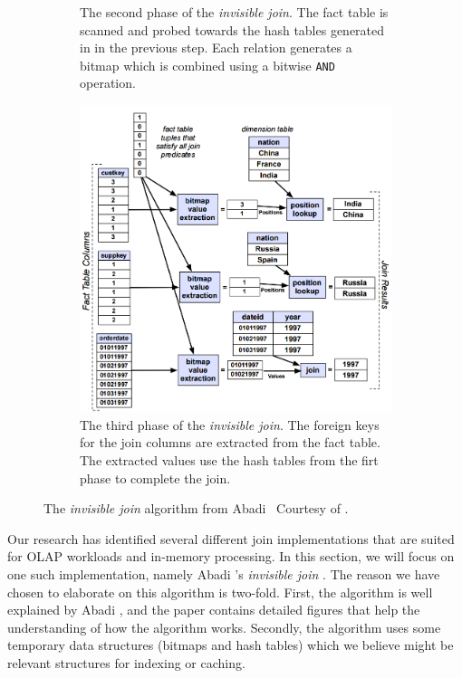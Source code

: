 \begin{figure}
\begin{subfigure}{0.48\textwidth}
    \caption{The second phase of the \textit{invisible join}. The fact table is scanned and probed towards the hash tables generated in in the previous step. Each relation generates a bitmap which is combined using a bitwise \texttt{AND} operation.}
    \label{fig:invisible-join-2} 
  \end{subfigure}
  \begin{subfigure}{0.48\textwidth}
    \includegraphics[width=\textwidth]{img/invisible-join-3.png}
    \caption{The third phase of the \textit{invisible join}. The foreign keys for the join columns are extracted from the fact table. The extracted values use the  hash tables from the firt phase to complete the join.}
    \label{fig:invisible-join-3} 
  \end{subfigure}
  \caption{The \textit{invisible join} algorithm from Abadi \ea~Courtesy of \cite{Abadi2008-dd}.}
  \label{fig:invisible-join} 
\end{figure}

Our research has identified several different join implementations that are suited for OLAP workloads and in-memory processing. In this section, we will focus on one such implementation, namely Abadi \ea's \textit{invisible join} \cite{Abadi2008-dd}. The reason we have chosen to elaborate on this algorithm is two-fold. First, the algorithm is well explained by Abadi \ea, and the paper contains detailed figures that help the understanding of how the algorithm works. Secondly, the algorithm uses some temporary data structures (bitmaps and hash tables) which we believe might be relevant structures for indexing or caching.

